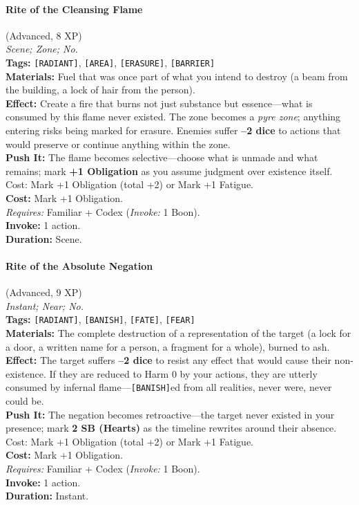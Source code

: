 \paragraph{Rite of the Cleansing Flame} (Advanced, 8 XP) \hfill \\
\emph{Scene; Zone; No.} \\
\textbf{Tags:} \texttt{[RADIANT]}, \texttt{[AREA]}, \texttt{[ERASURE]}, \texttt{[BARRIER]} \\
\textbf{Materials:} Fuel that was once part of what you intend to destroy (a beam from the building, a lock of hair from the person). \\
\textbf{Effect:} Create a fire that burns not just substance but essence---what is consumed by this flame never existed. The zone becomes a \textit{pyre zone}; anything entering risks being marked for erasure. Enemies suffer \textbf{--2 dice} to actions that would preserve or continue anything within the zone. \\
\textbf{Push It:} The flame becomes selective---choose what is unmade and what remains; mark \textbf{+1 Obligation} as you assume judgment over existence itself. Cost: Mark +1 Obligation (total +2) or Mark +1 Fatigue. \\
\textbf{Cost:} Mark +1 Obligation. \\
\textit{Requires:} Familiar + Codex (\textit{Invoke:} 1 Boon). \\
\textbf{Invoke:} 1 action. \\
\textbf{Duration:} Scene.

\paragraph{Rite of the Absolute Negation} (Advanced, 9 XP) \hfill \\
\emph{Instant; Near; No.} \\
\textbf{Tags:} \texttt{[RADIANT]}, \texttt{[BANISH]}, \texttt{[FATE]}, \texttt{[FEAR]} \\
\textbf{Materials:} The complete destruction of a representation of the target (a lock for a door, a written name for a person, a fragment for a whole), burned to ash. \\
\textbf{Effect:} The target suffers \textbf{--2 dice} to resist any effect that would cause their non-existence. If they are reduced to Harm 0 by your actions, they are utterly consumed by infernal flame---\texttt{[BANISH]}ed from all realities, never were, never could be. \\
\textbf{Push It:} The negation becomes retroactive---the target never existed in your presence; mark \textbf{2 SB (Hearts)} as the timeline rewrites around their absence. Cost: Mark +1 Obligation (total +2) or Mark +1 Fatigue. \\
\textbf{Cost:} Mark +1 Obligation. \\
\textit{Requires:} Familiar + Codex (\textit{Invoke:} 1 Boon). \\
\textbf{Invoke:} 1 action. \\
\textbf{Duration:} Instant.

